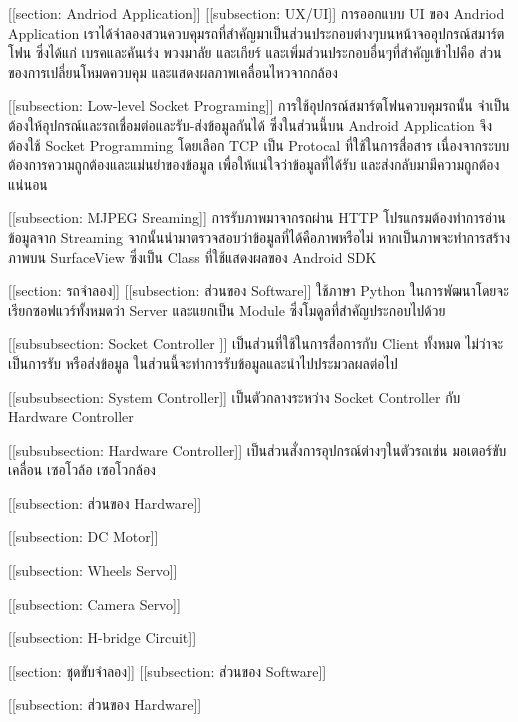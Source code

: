 [[section: Andriod Application]]
	[[subsection: UX/UI]]
		การออกแบบ UI ของ Andriod Application เราได้จำลองสวนควบคุมรถที่สำคัญมาเป็นส่วนประกอบต่างๆบนหน้าจออุปกรณ์สมาร์ตโฟน ซึ่งได้แก่ เบรคและคันเร่ง พวงมาลัย และเกียร์ และเพิ่มส่วนประกอบอื่นๆที่สำคัญเข้าไปคือ ส่วนของการเปลี่ยนโหมดควบคุม และแสดงผลภาพเคลื่อนไหวจากกล้อง

	[[subsection: Low-level Socket Programing]]
		การใช้อุปกรณ์สมาร์ตโฟนควบคุมรถนั้น จำเป็นต้องให้อุปกรณ์และรถเชื่อมต่อและรับ-ส่งข้อมูลกันได้ ซึ่งในส่วนนี้บน Android Application จึงต้องใช้ Socket Programming โดยเลือก TCP เป็น Protocal ที่ใช้ในการสื่อสาร 
		เนื่องจากระบบต้องการความถูกต้องและแม่นยำของข้อมูล เพื่อให้แน่ใจว่าข้อมูลที่ได้รับ และส่งกลับมามีความถูกต้องแน่นอน

	[[subsection: MJPEG Sreaming]]
		การรับภาพมาจากรถผ่าน HTTP โปรแกรมต้องทำการอ่านข้อมูลจาก Streaming จากนั้นนำมาตรวจสอบว่าข้อมูลที่ได้คือภาพหรือไม่ หากเป็นภาพจะทำการสร้างภาพบน SurfaceView ซึ่งเป็น Class ที่ใช้แสดงผลของ Android SDK

[[section: รถจำลอง]]
	[[subsection: ส่วนของ Software]]
		ใช้ภาษา Python ในการพัฒนาโดยจะเรียกซอฟแวร์ทั้งหมดว่า Server และแยกเป็น Module ซึ่งโมดูลที่สำคัญประกอบไปด้วย

		[[subsubsection: Socket Controller ]]
			เป็นส่วนที่ใช้ในการสื่อการกับ Client ทั้งหมด ไม่ว่าจะเป็นการรับ หรือส่งข้อมูล ในส่วนนี้จะทำการรับข้อมูลและนำไปประมวลผลต่อไป

		[[subsubsection: System Controller]]
			เป็นตัวกลางระหว่าง Socket Controller กับ Hardware Controller 

		[[subsubsection: Hardware Controller]]
			เป็นส่วนสั่งการอุปกรณ์ต่างๆในตัวรถเช่น มอเตอร์ขับเคลื่อน เซอโวล้อ เซอโวกล้อง
			

	[[subsection: ส่วนของ Hardware]]

		[[subsection: DC Motor]]

		[[subsection: Wheels Servo]]
		
		[[subsection: Camera Servo]]

		[[subsection: H-bridge Circuit]]
	
[[section: ชุดขับจำลอง]]
	[[subsection: ส่วนของ Software]]
		

	[[subsection: ส่วนของ Hardware]]

